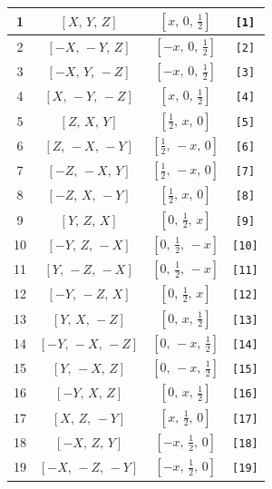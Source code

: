 \documentclass[fleqn,8pt]{jsarticle}
\begin{document}
\begin{longtable}{cccc}
1 & $\left[ X,\, Y,\, Z \right]$ & $\left[ x,\, 0,\, \frac{1}{2} \right]$ & {\tt [1]} \\ \hline
2 & $\left[ - X,\, - Y,\, Z \right]$ & $\left[ - x,\, 0,\, \frac{1}{2} \right]$ & {\tt [2]} \\ \hline
3 & $\left[ - X,\, Y,\, - Z \right]$ & $\left[ - x,\, 0,\, \frac{1}{2} \right]$ & {\tt [3]} \\ \hline
4 & $\left[ X,\, - Y,\, - Z \right]$ & $\left[ x,\, 0,\, \frac{1}{2} \right]$ & {\tt [4]} \\ \hline
5 & $\left[ Z,\, X,\, Y \right]$ & $\left[ \frac{1}{2},\, x,\, 0 \right]$ & {\tt [5]} \\ \hline
6 & $\left[ Z,\, - X,\, - Y \right]$ & $\left[ \frac{1}{2},\, - x,\, 0 \right]$ & {\tt [6]} \\ \hline
7 & $\left[ - Z,\, - X,\, Y \right]$ & $\left[ \frac{1}{2},\, - x,\, 0 \right]$ & {\tt [7]} \\ \hline
8 & $\left[ - Z,\, X,\, - Y \right]$ & $\left[ \frac{1}{2},\, x,\, 0 \right]$ & {\tt [8]} \\ \hline
9 & $\left[ Y,\, Z,\, X \right]$ & $\left[ 0,\, \frac{1}{2},\, x \right]$ & {\tt [9]} \\ \hline
10 & $\left[ - Y,\, Z,\, - X \right]$ & $\left[ 0,\, \frac{1}{2},\, - x \right]$ & {\tt [10]} \\ \hline
11 & $\left[ Y,\, - Z,\, - X \right]$ & $\left[ 0,\, \frac{1}{2},\, - x \right]$ & {\tt [11]} \\ \hline
12 & $\left[ - Y,\, - Z,\, X \right]$ & $\left[ 0,\, \frac{1}{2},\, x \right]$ & {\tt [12]} \\ \hline
13 & $\left[ Y,\, X,\, - Z \right]$ & $\left[ 0,\, x,\, \frac{1}{2} \right]$ & {\tt [13]} \\ \hline
14 & $\left[ - Y,\, - X,\, - Z \right]$ & $\left[ 0,\, - x,\, \frac{1}{2} \right]$ & {\tt [14]} \\ \hline
15 & $\left[ Y,\, - X,\, Z \right]$ & $\left[ 0,\, - x,\, \frac{1}{2} \right]$ & {\tt [15]} \\ \hline
16 & $\left[ - Y,\, X,\, Z \right]$ & $\left[ 0,\, x,\, \frac{1}{2} \right]$ & {\tt [16]} \\ \hline
17 & $\left[ X,\, Z,\, - Y \right]$ & $\left[ x,\, \frac{1}{2},\, 0 \right]$ & {\tt [17]} \\ \hline
18 & $\left[ - X,\, Z,\, Y \right]$ & $\left[ - x,\, \frac{1}{2},\, 0 \right]$ & {\tt [18]} \\ \hline
19 & $\left[ - X,\, - Z,\, - Y \right]$ & $\left[ - x,\, \frac{1}{2},\, 0 \right]$ & {\tt [19]} \\ \hline

\end{longtable}
\end{document}
